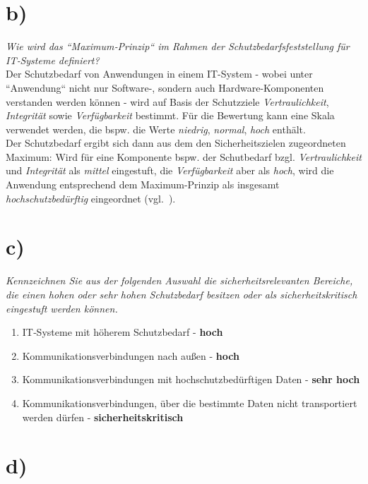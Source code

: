 \section{b)}

\textit{Wie wird das ``Maximum‐Prinzip`` im Rahmen der Schutzbedarfsfeststellung für IT‐Systeme definiert?}\\

\noindent
Der Schutzbedarf von Anwendungen in einem IT-System - wobei unter ``Anwendung`` nicht nur Software-, sondern auch Hardware-Komponenten verstanden werden können - wird auf Basis der Schutzziele \textit{Vertraulichkeit}, \textit{Integrität} sowie \textit{Verfügbarkeit} bestimmt.
Für die Bewertung kann eine Skala verwendet werden, die bspw. die Werte \textit{niedrig}, \textit{normal}, \textit{hoch} enthält.\\
Der Schutzbedarf ergibt sich dann aus dem den Sicherheitszielen zugeordneten Maximum: Wird für eine Komponente bspw. der Schutbedarf bzgl. \textit{Vertraulichkeit} und \textit{Integrität} als \textit{mittel} eingestuft, die \textit{Verfügbarkeit} aber als \textit{hoch}, wird die Anwendung entsprechend dem Maximum-Prinzip als insgesamt \textit{hochschutzbedürftig} eingeordnet (vgl.~\cite[114]{BSI200-2}).

\section{c)}

\textit{Kennzeichnen Sie aus der folgenden Auswahl die sicherheitsrelevanten Bereiche,
    die einen hohen oder sehr hohen Schutzbedarf besitzen oder als
    sicherheitskritisch eingestuft werden können.
}\\

\begin{enumerate}
    \itemsep0.5em
    \item IT‐Systeme mit höherem Schutzbedarf - \textbf{hoch}
    \item Kommunikationsverbindungen nach außen  - \textbf{hoch}
    \item Kommunikationsverbindungen mit hochschutzbedürftigen Daten  - \textbf{sehr hoch}
    \item Kommunikationsverbindungen, über die bestimmte Daten nicht transportiert werden dürfen  - \textbf{sicherheitskritisch}
\end{enumerate}


\section{d)}

